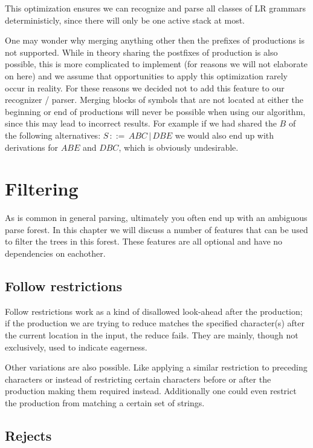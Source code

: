 \documentclass[a4paper,10pt]{article}
\begin{document}
This optimization ensures we can recognize and parse all classes of LR grammars deterministicly, since there will only be one active stack at most.

One may wonder why merging anything other then the prefixes of productions is not supported. While in theory sharing the postfixes of production is also possible, this is more complicated to implement (for reasons we will not elaborate on here) and we assume that opportunities to apply this optimization rarely occur in reality. For these reasons we decided not to add this feature to our recognizer / parser. Merging blocks of symbols that are not located at either the beginning or end of productions will never be possible when using our algorithm, since this may lead to incorrect results. For example if we had shared the $B$ of the following alternatives: $S\,::=\,ABC\,|\,DBE$ we would also end up with derivations for $ABE$ and $DBC$, which is obviously undesirable.

\section{Filtering}
\label{chap:filtering}

As is common in general parsing, ultimately you often end up with an ambiguous parse forest. In this chapter we will discuss a number of features that can be used to filter the trees in this forest. These features are all optional and have no dependencies on eachother.

\subsection{Follow restrictions}

Follow restrictions work as a kind of disallowed look-ahead after the production; if the production we are trying to reduce matches the specified character(s) after the current location in the input, the reduce fails. They are mainly, though not exclusively, used to indicate eagerness.

Other variations are also possible. Like applying a similar restriction to preceding characters or instead of restricting certain characters before or after the production making them required instead. Additionally one could even restrict the production from matching a certain set of strings.

\subsection{Rejects}
\end{document}
